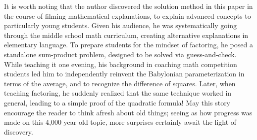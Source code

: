 \documentclass[11pt]{article}
\begin{document}
It is worth noting that the author discovered the solution method in this paper
in the course of filming mathematical explanations, to explain advanced concepts
to particularly young students. Given his audience, he was systematically going
through the middle school math curriculum, creating alternative explanations in
elementary language. To prepare students for the mindset of factoring, he posed
a standalone sum-product problem, designed to be solved via guess-and-check.
While teaching it one evening, his background in coaching math competition
students led him to independently reinvent the Babylonian parameterization in
terms of the average, and to recognize the difference of squares. Later, when
teaching factoring, he suddenly realized that the same technique worked in
general, leading to a simple proof of the quadratic formula! May this story
encourage the reader to think afresh about old things; seeing as how progress
was made on this 4,000 year old topic, more surprises certainly await the light
of discovery.
\end{document}
